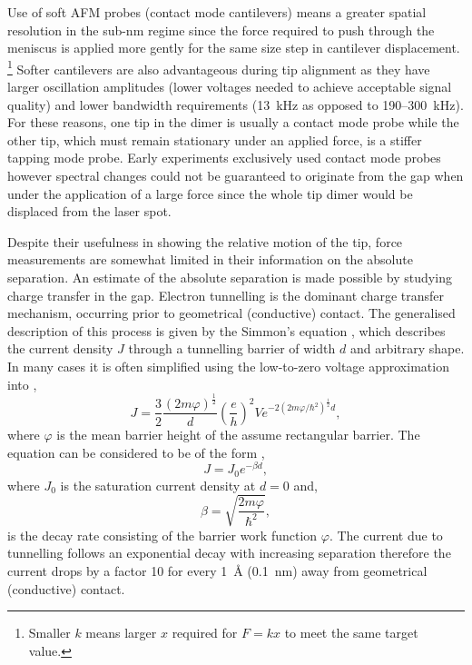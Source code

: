 \documentclass[a4paper]{article}
\begin{document}
Use of soft AFM probes (contact mode cantilevers) means a greater spatial resolution in the sub-nm regime since the force required to push through the meniscus is applied more gently for the same size step in cantilever displacement.%
\footnote{Smaller $k$ means larger $x$ required for $F=kx$ to meet the same target value.}
Softer cantilevers are also advantageous during tip alignment as they have larger oscillation amplitudes (lower voltages needed to achieve acceptable signal quality) and lower bandwidth requirements (\SI{13}{kHz} as opposed to 190--\SI{300}{kHz}).
For these reasons, one tip in the dimer is usually a contact mode probe while the other tip, which must remain stationary under an applied force, is a stiffer tapping mode probe. Early experiments exclusively used contact mode probes however spectral changes could not be guaranteed to originate from the gap when under the application of a large force since the whole tip dimer would be displaced from the laser spot.

Despite their usefulness in showing the relative motion of the tip, force measurements are somewhat limited in their information on the absolute separation. An estimate of the absolute separation is made possible by studying charge transfer in the gap.
Electron tunnelling is the dominant charge transfer mechanism, occurring prior to geometrical (conductive) contact. The generalised description of this process is given by the Simmon's equation \cite{simmons1963generalized}, which describes the current density $J$ through a tunnelling barrier of width $d$ and arbitrary shape. In many cases it is often simplified using the low-to-zero voltage approximation into \cite{simmons1963generalized},
\begin{equation} J = \frac{3}{2} \frac{(2m\varphi)^{\frac{1}{2}}}{d} \left(\frac{e}{h}\right)^2 V e^{-2({2m\varphi}/{\hbar^2})^{\frac{1}{2}}d},
\end{equation}
where $\varphi$ is the mean barrier height of the assume rectangular barrier. The equation can be considered to be of the form \cite{ tan2014},
\begin{equation} J=J_0e^{-\beta d}, \end{equation}
where $J_0$ is the saturation current density at $d=0$ and,
\begin{equation} \beta = \sqrt{\frac{2m\varphi}{\hbar^2}}, \end{equation}
is the decay rate consisting of the barrier work function $\varphi$. The current due to tunnelling follows an exponential decay with increasing separation therefore the current drops by a factor 10 for every \SI{1}{\angstrom} (\SI{0.1}{nm}) away from geometrical (conductive) contact.
\end{document}
